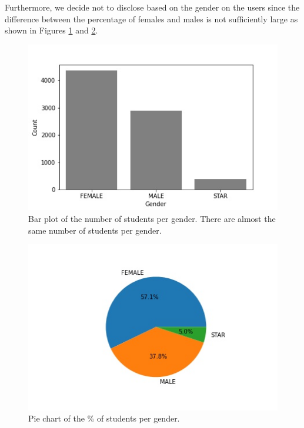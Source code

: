 \documentclass[sigplan,screen]{acmart}
\begin{document}
Furthermore, we decide not to disclose based on the gender on the users since the difference between the percentage of females and males is not sufficiently large as shown in Figures \ref{fig:gender} and \ref{fig:pie_chart}.

\begin{figure}
    \centering
    \includegraphics[width=\linewidth]{reports/figures/num_per_gender.jpg}
    \caption{Bar plot of the number of students per gender. There are almost the same number of students per gender.}
    \label{fig:gender}
\end{figure}

\begin{figure}
    \centering
    \includegraphics[width=\linewidth]{reports/figures/pie_chart.jpg}
    \caption{Pie chart of the \% of students per gender.}
    \label{fig:pie_chart}
\end{figure}
\end{document}
